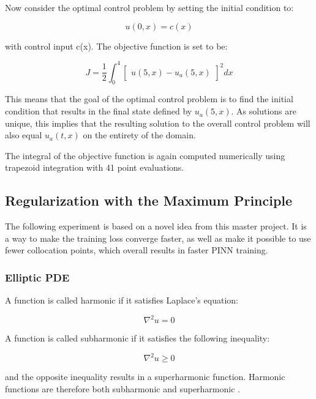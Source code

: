 Now consider the optimal control problem by setting the initial condition to:

\begin{equation}
    u(0, x) = c(x)
\end{equation}

\noindent with control input c(x). The objective function is set to be:

\begin{equation}
    J = \frac{1}{2} \int_{0}^{4} \begin{bmatrix} u(5, x) - u_a(5, x) \end{bmatrix}^2 dx
\end{equation}

This means that the goal of the optimal control problem is to find the initial condition that results in the final state defined by $u_a(5, x)$. As solutions are unique, this implies that the resulting solution to the overall control problem will also equal $u_a(t, x)$ on the entirety of the domain.

The integral of the objective function is again computed numerically using trapezoid integration with 41 point evaluations.

\subsection{Regularization with the Maximum Principle}

The following experiment is based on a novel idea from this master project. It is a way to make the training loss converge faster, as well as make it possible to use fewer collocation points, which overall results in faster PINN training.

\subsubsection{Elliptic PDE}

A function is called harmonic if it satisfies Laplace's equation:

\begin{equation}
    \nabla^2 u = 0
\end{equation}

A function is called subharmonic if it satisfies the following inequality:

\begin{equation}
    \nabla^2 u \geq 0
\end{equation}

\noindent and the opposite inequality results in a superharmonic function. Harmonic functions are therefore both subharmonic and superharmonic \cite{pdebookcourse}.

